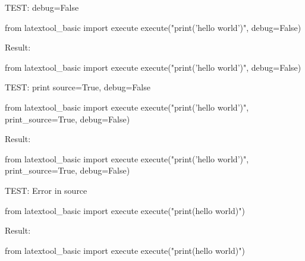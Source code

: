 \newpage
TEST: debug=False
\begin{console}
from latextool_basic import execute
execute("print('hello world')", debug=False)
\end{console}
Result:
\begin{python}
from latextool_basic import execute
execute("print('hello world')", debug=False)
\end{python}




\newpage
TEST: print source=True, debug=False
\begin{console}
from latextool_basic import execute
execute("print('hello world')", print_source=True, debug=False)
\end{console}
Result:
\begin{python}
from latextool_basic import execute
execute("print('hello world')", print_source=True, debug=False)
\end{python}




\newpage
TEST: Error in source
\begin{console}
from latextool_basic import execute
execute("print(hello world)")
\end{console}
Result:
\begin{python}
from latextool_basic import execute
execute("print(hello world)")
\end{python}
